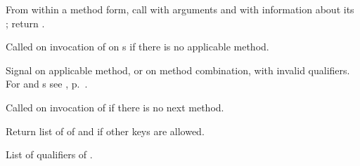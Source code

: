 \begin{LIST}{1cm}
  {
  From within a method form, call  with arguments and
  with information about its ; return . 
  }

  {
  Called on invocation of  on s if
  there is no applicable method. 
  }

  {
  Signal  on applicable method, or on method combination,
  with invalid qualifiers. For  and s see
  , p.\ \pageref{section:Format}.  
  }

  {
  Called on invocation of  if there is no next method.
  }

  {
  Return list of  of  and
  \retvalii{\T} if other keys are allowed.
  }

  {
  List of qualifiers of .
  }


\end{LIST}

